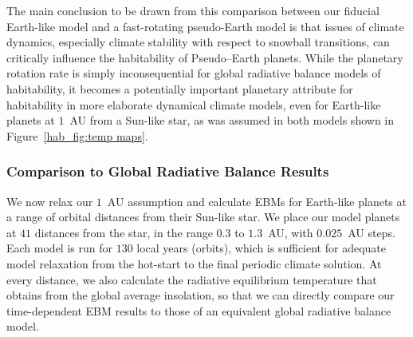 The main conclusion to be drawn from this comparison between our
fiducial Earth-like model and a fast-rotating pseudo-Earth model is
that issues of climate dynamics, especially climate stability with
respect to snowball transitions, can critically influence the
habitability of Pseudo--Earth planets. While the planetary rotation
rate is simply inconsequential for global radiative balance models of
habitability, it becomes a potentially important planetary attribute
for habitability in more elaborate dynamical climate models, even for
Earth-like planets at $1$~AU from a Sun-like star, as was assumed in
both models shown in Figure~\ref{hab_fig:temp maps}.


\subsubsection{Comparison to Global Radiative Balance Results}

We now relax our $1$~AU assumption and calculate EBMs for Earth-like
planets at a range of orbital distances from their Sun-like star. We
place our model planets at $41$ distances from the star, in the range
$0.3$ to $1.3$~AU, with $0.025$~AU steps.  Each model is run for $130$
local years (orbits), which is sufficient for adequate model
relaxation from the hot-start to the final periodic climate solution.
At every distance, we also calculate the radiative equilibrium
temperature that obtains from the global average insolation, so that
we can directly compare our time-dependent EBM results to those of an
equivalent global radiative balance model.

